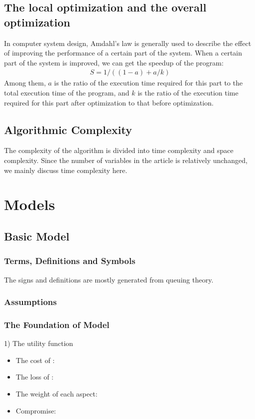\documentclass{apmcmthesis}
\begin{document}
\subsection{The local optimization and the overall optimization}
In computer system design, Amdahl's law is generally used to describe the effect of improving the performance of a certain part of the system. When a certain part of the system is improved, we can get the speedup of the program:
\begin{align}
  S=1/((1-a)+a/k)
\end{align}
Among them, $a$ is the ratio of the execution time required for this part to the total execution time of the program, and $k$ is the ratio of the execution time required for this part after optimization to that before optimization.
\subsection{Algorithmic Complexity}
The complexity of the algorithm is divided into time complexity and space complexity. Since the number of variables in the article is relatively unchanged, we mainly discuss time complexity here.


\section{Models}
\subsection{Basic Model}


\subsubsection{Terms, Definitions and Symbols}
The signs and definitions are mostly generated from queuing theory.


\subsubsection{Assumptions}


\subsubsection{The Foundation of Model}
1) The utility function

\begin{itemize}
  \item The cost of       :
  \item The loss of       :
  \item The weight of each aspect:
  \item Compromise:
\end{itemize}
\end{document}
